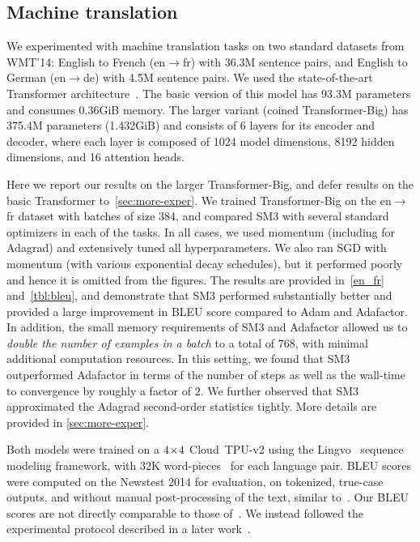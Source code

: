 \documentclass[a4paper,11pt]{article}
\def\NAME{SM3\xspace}
\newcommand{\entode}{en$\to$de\xspace}
\newcommand{\entofr}{en$\to$fr\xspace}
\begin{document}
\subsection{Machine translation}
We experimented with machine translation tasks on two standard datasets from
WMT'14: English to French (\entofr) with 36.3M sentence pairs, and English to
German (\entode) with 4.5M sentence pairs. We used the state-of-the-art
Transformer architecture~\citet{vaswani2017attention}. The basic version of
this model has 93.3M parameters and consumes 0.36GiB memory. The larger variant
(coined Transformer-Big) has 375.4M parameters (1.432GiB) and consists of 6
layers for its encoder and decoder, where each layer is composed of 1024 model
dimensions, 8192 hidden dimensions, and 16 attention heads.

Here we report our results on the larger Transformer-Big, and defer results on
the basic Transformer to~\cref{sec:more-exper}. We trained Transformer-Big on
the \entofr  dataset with batches of size 384, and compared \NAME with several
standard optimizers in each of the tasks. In all cases, we used momentum
(including for Adagrad) and extensively tuned all hyperparameters. We also ran
SGD with momentum (with various exponential decay schedules), but it performed
poorly and hence it is omitted from the figures.
The results are provided in~\cref{en_fr} and~\cref{tbl:bleu}, and demonstrate
that \NAME performed substantially better and provided a large improvement in
BLEU score compared to Adam and Adafactor. In addition, the small memory
requirements of \NAME and Adafactor allowed us to \emph{double the number of
examples in a batch} to a total of 768, with minimal additional computation
resources. In this setting, we found that \NAME outperformed Adafactor in terms
of the number of steps as well as the wall-time to convergence by roughly a
factor of $2$. We further observed that \NAME approximated the Adagrad
second-order statistics tightly. More details are provided in
\cref{sec:more-exper}.

Both models were trained on a $\4x4$ Cloud~TPU-v2 using the
Lingvo~\citep{lingvo} sequence modeling framework, with 32K
word-pieces~\cite{schuster12} for each language pair. BLEU scores were computed
on the Newstest 2014 for evaluation, on tokenized, true-case outputs, and
without manual post-processing of the text, similar to~\cite{wu2016google}. Our
BLEU scores are not directly comparable to those
of~\cite{vaswani2017attention}.  We instead followed the experimental protocol
described in a later work~\cite{chen18}.
\end{document}
